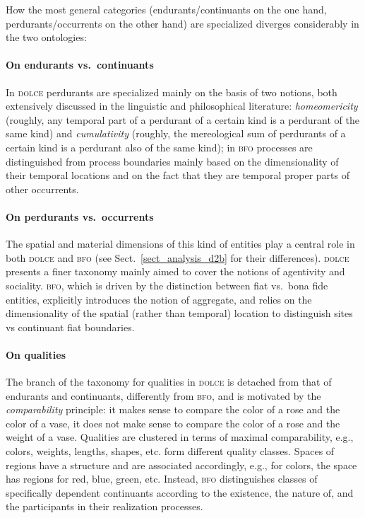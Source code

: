 \documentclass[ao]{iosart2x}
\newcommand{\dolce}{{\textsc{dolce}}}
\newcommand{\bfo}{{\textsc{bfo}}}
\begin{document}
How the most general categories (endurants/continuants on the one hand, perdurants/occurrents on the other hand) are specialized diverges considerably in the two ontologies:

\paragraph{On endurants vs.~continuants} In {\dolce} perdurants are specialized mainly on the basis of two notions, both extensively discussed in the linguistic and philosophical literature: \emph{homeomericity} (roughly, any temporal part of a perdurant of a certain kind is a perdurant of the same kind) and \emph{cumulativity} (roughly, the mereological sum of perdurants of a certain kind is a perdurant also of the same kind); in {\bfo} processes are distinguished from process boundaries mainly based on the dimensionality of their temporal locations and on the fact that they are temporal proper parts of other occurrents.

\paragraph{On perdurants vs.~occurrents} The spatial and material dimensions of this kind of entities play a central role in both {\dolce} and {\bfo} (see Sect.~\ref{sect_analysis_d2b} for their differences). {\dolce} presents a finer taxonomy mainly aimed to cover the notions of agentivity and sociality. {\bfo}, which is driven by the distinction between fiat vs.~bona fide entities, explicitly introduces the notion of aggregate, and relies on the dimensionality of the spatial (rather than temporal) location to distinguish sites vs continuant fiat boundaries.

\paragraph{On qualities} The branch of the taxonomy for qualities in {\dolce} is detached from that of endurants and continuants, differently from {\bfo}, and is motivated by the \emph{comparability} principle: it makes sense to compare the color of a rose and the color of a vase, it does not make sense to compare the color of a rose and the weight of a vase. Qualities are clustered in terms of maximal comparability, e.g., colors, weights, lengths, shapes, etc. form different quality classes. Spaces of regions have a structure and are associated accordingly, e.g., for colors, the space has regions for red, blue, green, etc. Instead, {\bfo} distinguishes classes of specifically dependent continuants according to the existence, the nature of, and the participants in their realization processes.
\end{document}
